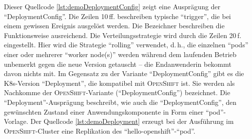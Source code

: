 

Dieser Quellcode \vref{lst:demoDeploymentConfig}\autocite[vgl.][Application\,$\rightarrow$\,Deployments]{red_hat_inc_okd_2019} zeigt eine Ausprägung der \enquote{DeploymentConfig}. Die Zeilen 10\,ff. beschreiben typische \enquote{trigger}, die bei einem gewissen Ereignis ausgelöst werden. Die Bezeichner beschreiben die Funktionsweise ausreichend. Die Verteilungsstrategie wird durch die Zeilen 20\,f. eingestellt. Hier wird die Strategie \enquote{rolling} verwendet, d.\,h., die einzelnen \enquote{pods} einer oder mehrerer \enquote{worker node(s)} werden während dem laufenden Betrieb unbemerkt gegen die neue Version getauscht -- die Endanwenderin bekommt davon nichts mit. Im Gegensatz zu der Variante \enquote{DeploymentConfig} gibt es die \acl{K8s}-Version \enquote{Deployment}, die kompatibel mit \textsc{OpenShift} ist. Sie werden als Nachkomme der \textsc{OpenShift}-Variante (\enquote{DeploymentConfig})\autocite[vgl.][Application\,$\rightarrow$\,Deployments]{red_hat_inc_okd_2019} bezeichnet. Die \enquote{Deployment}-Ausprägung beschreibt, wie auch die \enquote{DeploymentConfig}, den gewünschten Zustand einer Anwendungskomponente in Form einer \enquote{pod}-Vorlage. Der Quellcode \vref{lst:demoDeployment}\autocite[vgl.][Application\,$\rightarrow$\,Deployments]{red_hat_inc_okd_2019} erzeugt bei der Ausführung im \textsc{OpenShift}-Cluster eine Replikation des \enquote{hello-openshift}-\enquote{pod}.



